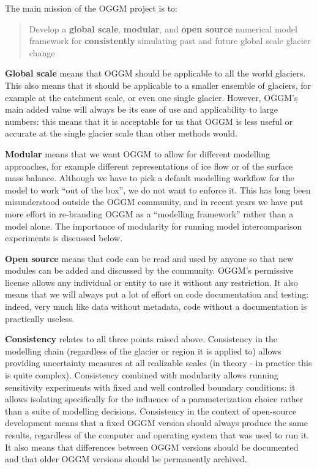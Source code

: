 The main mission of the OGGM project is to:

\begin{quote}
Develop a \textbf{global scale}, \textbf{modular}, and \textbf{open source} numerical model framework for \textbf{consistently} simulating past and future global scale glacier change
\end{quote}

\textbf{Global scale} means that OGGM should be applicable to all the world glaciers. This also means that it should be
applicable to a smaller ensemble of glaciers, for example at the catchment scale, or even one single glacier. However,
OGGM’s main added value will always be its ease of use and applicability to large numbers: this means that it is
acceptable for us that OGGM is less useful or accurate at the single glacier scale than other methods would.

\textbf{Modular} means that we want OGGM to allow for different modelling approaches, for example different representations
of ice flow or of the surface mass balance. Although we have to pick a default modelling workflow for the model to
work “out of the box”, we do not want to enforce it. This has long been misunderstood outside the OGGM community, and
in recent years we have put more effort in re-branding OGGM as a “modelling framework” rather than a model alone. The
importance of modularity for running model intercomparison experiments is discussed below.

\textbf{Open source} means that code can be read and used by anyone so that new modules can be added and discussed by the
community. OGGM’s permissive license allows any individual or entity to use it without any restriction. It also means
that we will always put a lot of effort on code documentation and testing: indeed, very much like data without metadata,
code without a documentation is practically useless.

\textbf{Consistency} relates to all three points raised above. Consistency in the modelling chain (regardless of the glacier
or region it is applied to) allows providing uncertainty measures at all realizable scales (in theory - in practice
this is quite complex). Consistency combined with modularity allows running sensitivity experiments with fixed and well
controlled boundary conditions: it allows isolating specifically for the influence of a parameterization choice rather
than a suite of modelling decisions. Consistency in the context of open-source development means that a fixed OGGM
version should always produce the same results, regardless of the computer and operating system that was used to run it.
It also means that differences between OGGM versions should be documented and that older OGGM versions should be
permanently archived.


